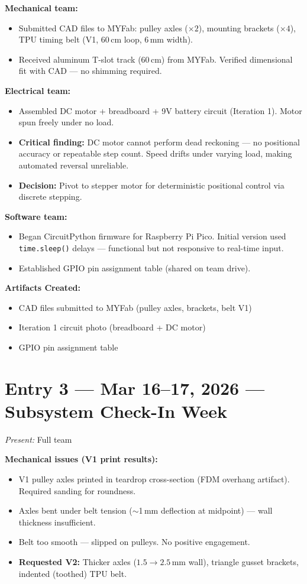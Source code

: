 \documentclass[12pt, letterpaper]{article}
\newcommand{\logentry}[2]{%
  \section{#1}%
  \textit{Present:} #2\par\vspace{1pt}%
}
\newcommand{\artifacts}{\par\vspace{1pt}\textbf{Artifacts Created:}\vspace{0pt}}
\begin{document}
\textbf{Mechanical team:}
\begin{itemize}
  \item Submitted CAD files to MYFab: pulley axles ($\times 2$), mounting brackets ($\times 4$), TPU timing belt (V1, 60\,cm loop, 6\,mm width).
  \item Received aluminum T-slot track (60\,cm) from MYFab. Verified dimensional fit with CAD --- no shimming required.
\end{itemize}

\textbf{Electrical team:}
\begin{itemize}
  \item Assembled DC motor + breadboard + 9V battery circuit (Iteration 1). Motor spun freely under no load.
  \item \textbf{Critical finding:} DC motor cannot perform dead reckoning --- no positional accuracy or repeatable step count. Speed drifts under varying load, making automated reversal unreliable.
  \item \textbf{Decision:} Pivot to stepper motor for deterministic positional control via discrete stepping.
\end{itemize}

\textbf{Software team:}
\begin{itemize}
  \item Began CircuitPython firmware for Raspberry Pi Pico. Initial version used \texttt{time.sleep()} delays --- functional but not responsive to real-time input.
  \item Established GPIO pin assignment table (shared on team drive).
\end{itemize}

\artifacts
\begin{itemize}
  \item CAD files submitted to MYFab (pulley axles, brackets, belt V1)
  \item Iteration 1 circuit photo (breadboard + DC motor)
  \item GPIO pin assignment table
\end{itemize}

\logentry{Entry 3 \textnormal{---} Mar 16--17, 2026 \textnormal{---} Subsystem Check-In Week}{Full team}

\textbf{Mechanical issues (V1 print results):}
\begin{itemize}
  \item V1 pulley axles printed in teardrop cross-section (FDM overhang artifact). Required sanding for roundness.
  \item Axles bent under belt tension ($\sim$1\,mm deflection at midpoint) --- wall thickness insufficient.
  \item Belt too smooth --- slipped on pulleys. No positive engagement.
  \item \textbf{Requested V2:} Thicker axles ($1.5 \rightarrow 2.5\,\text{mm}$ wall), triangle gusset brackets, indented (toothed) TPU belt.
\end{itemize}
\end{document}
